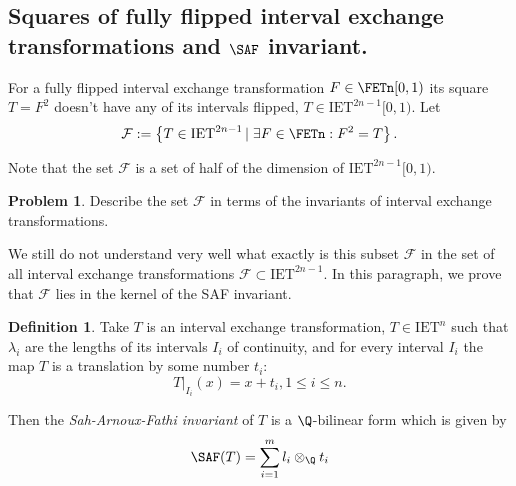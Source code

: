 \documentclass[12pt]{article}
\theoremstyle{definition}
\newtheorem{definition}{Definition}
\newtheorem*{problem}{Problem}
\begin{document}
\subsection{Squares of fully flipped interval exchange transformations and $\SAF$ invariant.}
For a fully flipped interval exchange transformation $F \in \FETn [0,1)$ its square $T=F^2$ doesn't have any of its intervals flipped, $T \in {\mathrm{IET}^{2n-1}} [0,1)$. Let 
\begin{equation*}
\mathcal{F}:=\left\{
T \in {\mathrm{IET}^{2n-1}} \left|\right. \exists F \in \FETn : F^2=T
\right\}.
\end{equation*}

Note that the set $\mathcal{F}$ is a set of half of the dimension of 
$ {\mathrm{IET}^{2n-1}} [0,1)$. 
%


\begin{problem}
Describe the set $\mathcal{F}$ in terms of the invariants of interval exchange transformations.
\end{problem}

We still do not understand very well what exactly is this subset $\mathcal{F}$ in the set of all interval exchange transformations $\mathcal{F} \subset {\mathrm{IET}^{2n-1}}$. In this paragraph, we prove that $\mathcal{F}$ lies in the kernel of the SAF invariant.

\begin{definition}
Take $T$ is an interval exchange transformation, $T \in \mathrm{IET}^n$ such that $\lambda_i$ are the lengths of its intervals $I_i$ of continuity, and for every interval $I_i$ the map $T$ is a translation by some number $t_i$:
\begin{equation*} 
\left.T\right|_{I_i} (x) = x+t_i, 1 \leq i \leq n.
\end{equation*}

Then the \emph{Sah-Arnoux-Fathi invariant }of $T$ is a $\Q$-bilinear form which is given by
\begin{equation}\label{def:SAF}
\SAF(T)=\sum_{i=1}^m l_i \otimes_{\Q} t_i
\end{equation}
\end{definition}
\end{document}
